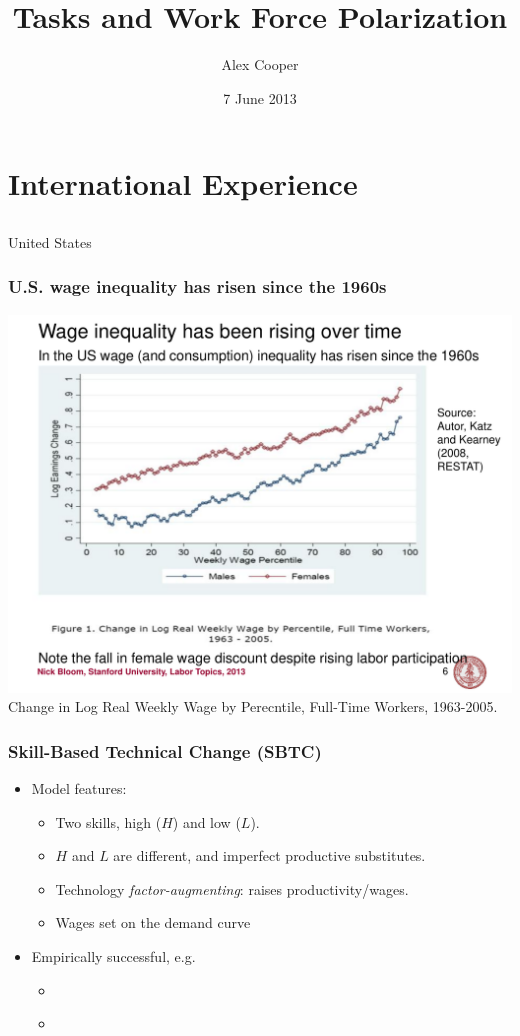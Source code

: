 \documentclass[red]{beamer}
\title[Polarization and Tasks]{Tasks and Work Force Polarization}
\author{Alex Cooper}
\date{7 June 2013}
\begin{document}
%
\begin{frame}
\titlepage
\end{frame}
%
\section{International Experience}
\subsection{}

\begin{frame}[t]{United States}
\frametitle{U.S. wage inequality has risen since the 1960s}
\begin{center}
  \includegraphics[width=\textwidth]{slides/katz_kearney_2008_log_e_chg.pdf}
  \\
  Change in Log Real Weekly Wage by Perecntile, Full-Time Workers, 1963-2005.
  \citep{Autor2008}
\end{center}
\end{frame}

\begin{frame}
\frametitle{Skill-Based Technical Change (SBTC)}
\begin{itemize}
\item Model features:
\begin{itemize}
\item Two skills, high ($H$) and low ($L$).
\item $H$ and $L$ are different, and imperfect productive substitutes.
\item Technology \emph{factor-augmenting}: raises productivity/wages.
\item Wages set on the demand curve
\end{itemize}
\vspace{1cm}
\item Empirically successful, e.g.
  \begin{itemize}
  \item \citet{Katz1992}
  \item \citet{Card2001}
  \end{itemize}
\end{itemize}
\end{frame}
\end{document}

